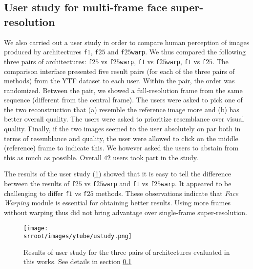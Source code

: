 \subsection{User study for multi-frame face super-resolution}
\label{sec:ustudy}


We also carried out a user study in order to compare human perception of images produced by architectures \texttt{f$1$}, \texttt{f$25$} and \texttt{f$25$warp}. 
We thus compared the following three pairs of architectures: \texttt{f$25$} vs \texttt{f$25$warp}, \texttt{f$1$} vs \texttt{f$25$warp}, \texttt{f$1$} vs \texttt{f$25$}. The comparison interface presented five result pairs (for each of the three pairs of methods) from the YTF dataset to each user. Within the pair, the order was randomized. Between the pair, we showed a full-resolution frame from the same sequence (different from the central frame). The users were asked to pick one of the two reconstruction that (a) resemble the reference image more and (b) has better overall quality. The users were asked to prioritize resemblance over visual quality. Finally, if the two images seemed to the user absolutely on par both in terms of resemblance and quality, the user were allowed to click on the middle (reference) frame to indicate this. We however asked the users to abstain from this as much as possible. Overall $42$ users took part in the study.


The results of the user study (\ref{fig:ustudy}) showed that it is easy to tell the difference between the results of  \texttt{f$25$} vs \texttt{f$25$warp}  and \texttt{f$1$} vs \texttt{f$25$warp}. It appeared to be challenging to differ \texttt{f$1$} vs \texttt{f$25$} methods. These observations indicate that \emph{Face Warping} module is essential for obtaining better results. Using more frames without warping thus did not bring advantage over single-frame super-resolution.

\begin{figure}[t]

\begin{center}
    

\texttt{[image: \\srroot/images/ytube/ustudy.png]}
\end{center}
\caption{Results of user study for the three pairs of architectures evaluated in this works. See details in section \ref{sec:ustudy}}

\label{fig:ustudy}



\vspace{10pt}
\end{figure}




